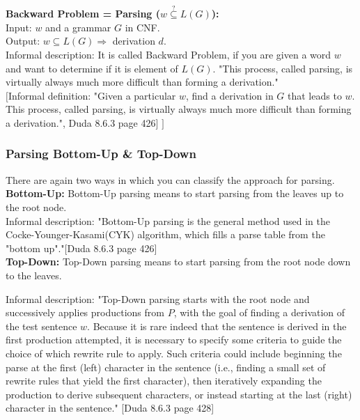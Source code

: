 \noindent\textbf{Backward Problem = Parsing ($w\overset{?}{\subseteq}L(G)$):}\\
Input: $w$ and a grammar $G$ in CNF.\\
Output: $w \subseteq L(G) \Longrightarrow$ derivation $d$.\\

\noindent Informal description: It is called Backward Problem, if you are given a word $w$ and want to determine if it is element of $L(G)$. "This process, called parsing, is virtually always much more difficult than forming a derivation."\\
\noindent$[$Informal definition: "Given a particular $w$, find a derivation in $G$ that leads to $w$. This process, called parsing, is virtually always much more difficult than forming a derivation.", Duda 8.6.3 page 426] $]$\\


\subsubsection{Parsing Bottom-Up \& Top-Down}
There are again two ways in which you can classify the approach for parsing.\\

\noindent\textbf{Bottom-Up:} Bottom-Up parsing means to start parsing from the leaves up to the root node.\\

\noindent Informal description: "Bottom-Up parsing is the general method used in the Cocke-Younger-Kasami(CYK) algorithm, which fills a parse table from the "bottom up"."[Duda 8.6.3 page 426] \\

\noindent\textbf{Top-Down:} Top-Down parsing means to start parsing from the root node down to the leaves.

\noindent Informal description: "Top-Down parsing starts with the root node and successively applies productions from $P$, with the goal of finding a derivation of the test sentence $w$. Because it is rare indeed that the sentence is derived in the first production attempted, it is necessary to specify some criteria to guide the choice of which rewrite rule to apply. Such criteria could include beginning the parse at the first (left) character in the sentence (i.e., finding a small set of rewrite rules that yield the first character), then iteratively expanding the production to derive subsequent characters, or instead starting at the last (right) character in the sentence." [Duda 8.6.3 page 428]\\

\pagebreak